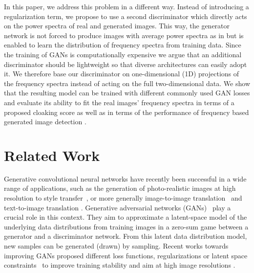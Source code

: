 \documentclass[letterpaper]{article} %
\begin{document}
In this paper, we address this problem in a different way. Instead of introducing a regularization term, we propose to use a second discriminator which directly acts on the power spectra of real and generated images. This way, the generator network is not forced to produce images with average power spectra as in \cite{margret2020upconvolution} but is enabled to learn the distribution of frequency spectra from training data.
Since the training of GANs is computationally expensive we argue that an additional discriminator should be lightweight so that diverse architectures can easily adopt it. We therefore base our discriminator on one-dimensional (1D) projections of the frequency spectra instead of acting on the full two-dimensional data. We show that the resulting model can be trained with different commonly used GAN losses and evaluate its ability to fit the real images' frequency spectra in terms of a proposed cloaking score as well as in terms of the performance of frequency based generated image detection \cite{margret2020upconvolution}.

\section{Related Work}
Generative convolutional neural networks have recently been successful in a wide range of applications, such as the generation of photo-realistic images at high resolution \cite{karras2017ProGAN,brock2018large,karras2019StyleGAN,karras2019StyleGAN2} to style transfer~\cite{isola2017image,zhu2017unpaired,zhu2017toward,huang2018multimodal}, or more generally image-to-image translation~\cite{pathak2016context,iizuka2017globally,zhu2017toward,choi2018stargan,mo2018instanceaware,karras2019style} and text-to-image translation \cite{reed2016generative,dai2017towards,zhang2017stackgan,zhang2018stackgan++}. 
Generative adversarial networks (GANs)~\cite{gan14nips} play a crucial role in this context. They aim to approximate a latent-space model of the underlying data distributions from training images in a zero-sum game between a generator and a discriminator network. From this latent data distribution model, new samples can be generated (drawn) by sampling. Recent works towards improving GANs proposed different loss functions, regularizations or latent space constraints~\cite{gulrajani2017wgan,mao2017least,gulrajani2017improved,miyato2018spectral_norm,mirza2014conditional,donahue2016adversarial,gurumurthy2017deligan,margret2020upconvolution,brock2018BigGAN,kodali2017convergence} to improve training stability and aim at high image resolutions  \cite{karras2017ProGAN,karras2019StyleGAN,karras2019StyleGAN2}.  
\end{document}
